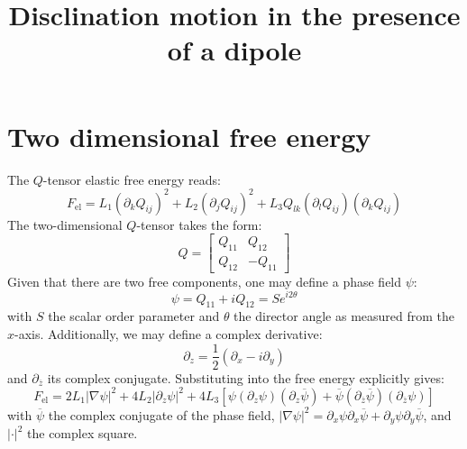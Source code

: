 \documentclass[reqno]{article}
\begin{document}
\title{Disclination motion in the presence of a dipole}
\maketitle

\section{Two dimensional free energy}

The $Q$-tensor elastic free energy reads:
\begin{equation}
    F_\text{el}
    =
    L_1 \left( \partial_k Q_{ij} \right)^2
    + L_2 \left( \partial_j Q_{ij} \right)^2
    + L_3 Q_{lk} \left( \partial_{l} Q_{ij} \right) \left( \partial_k Q_{ij} \right)
\end{equation}
The two-dimensional $Q$-tensor takes the form:
\begin{equation}
    Q
    =
    \begin{bmatrix}
        Q_{11} &Q_{12} \\
        Q_{12} &-Q_{11}
    \end{bmatrix}
\end{equation}
Given that there are two free components, one may define a phase field $\psi$:
\begin{equation}
    \psi
    =
    Q_{11} + iQ_{12}
    =
    S e^{i2\theta}
\end{equation}
with $S$ the scalar order parameter and $\theta$ the director angle as measured from the $x$-axis.
Additionally, we may define a complex derivative:
\begin{equation}
    \partial_z
    =
    \frac12 \left(\partial_x - i \partial_y\right)
\end{equation}
and $\partial_{\overline{z}}$ its complex conjugate.
Substituting into the free energy explicitly gives:
\begin{equation}
    F_\text{el}
    =
    2 L_1 \left| \nabla \psi \right|^2
    + 4 L_2 \left| \partial_z \psi \right|^2
    + 4 L_3 \left[ 
        \psi \left(\partial_z \psi\right) \left( \partial_z \overline{\psi} \right)
        +
        \overline{\psi} \left(\partial_{\overline{z}} \overline{\psi}\right) \left( \partial_{\overline{z}} \psi \right)
    \right]
\end{equation}
with $\overline{\psi}$ the complex conjugate of the phase field, $\left|\nabla \psi \right|^2 = \partial_x \psi \partial_x \overline{\psi} + \partial_y \psi \partial_y \overline{\psi}$, and $\left| \cdot \right|^2$ the complex square.
\end{document}
